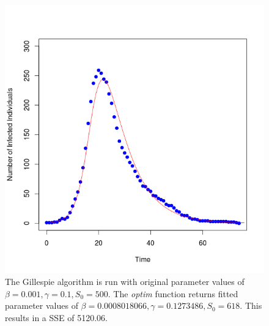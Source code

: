 \begin{centering}
\begin{figure}
\includegraphics[width=15cm]{simplefit.png}
\caption{The Gillespie algorithm is run with original parameter values of $\beta =
  0.001, \gamma = 0.1, S_0 = 500$. The \emph{optim} function returns
  fitted parameter values of $\beta = 0.0008018066, \gamma = 0.1273486, S_0
  = 618$. This results in a SSE of 5120.06.}
\end{figure}
\end{centering}



